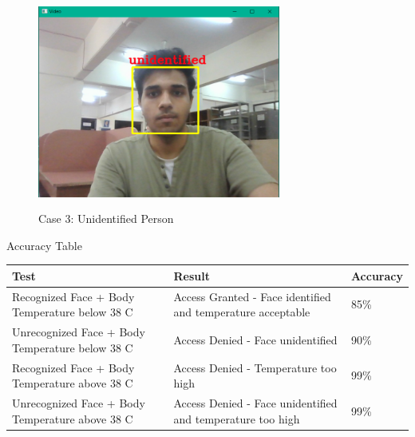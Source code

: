 \documentclass[conference]{IEEEtran}
\begin{document}
	\begin{figure}
		\centering
		\includegraphics[width=8cm, height=7cm]{Un.png}
		\caption{\label{fig:The-caption}Case 3: Unidentified Person}
	\end{figure}
	\begin{center}
		\caption{Accuracy Table}
		\begin{tabular}{ | m{6em} | m{3cm}| m{2cm} | } 
			\hline
			Test& Result & Accuracy \\ 
			\hline
			Recognized Face
			+ Body
			Temperature
			below 38 C & Access Granted -
			Face identified
			and temperature
			acceptable & 85\% \\ 
			\hline
			Unrecognized
			Face + Body
			Temperature
			below 38 C & Access Denied -
			Face unidentified & 90\% \\ 
			\hline
			Recognized Face
			+ Body
			Temperature
			above 38 C & Access Denied -
			Temperature too
			high & 99\% \\
			\hline
			Unrecognized
			Face + Body
			Temperature
			above 38 C & Access Denied -
			Face unidentified
			and temperature
			too high & 99\% \\
			\hline
		\end{tabular}
		\label{tab:caption}
	\end{center}
	
	\hfill
\end{document}
